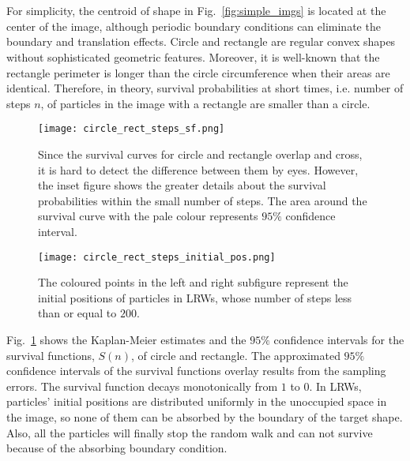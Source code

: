 


\section{}


For simplicity, the centroid of shape in Fig.~\ref{fig:simple_imgs} is
located at the center of the image, although periodic boundary
conditions can eliminate the boundary and translation effects. Circle
and rectangle are regular convex shapes without sophisticated
geometric features. Moreover, it is well-known that the rectangle
perimeter is longer than the circle circumference when their areas are
identical. Therefore, in theory, survival probabilities at short
times, i.e. number of steps $n$, of particles in the image with a
rectangle are smaller than a circle.


    \begin{figure}
      \centering
      \texttt{[image: circle\_rect\_steps\_sf.png]}
      \caption{Since the survival curves for circle and rectangle overlap and cross, it is hard to detect the difference between them by eyes. However, the inset figure shows the greater details about the survival probabilities within the small number of steps. The area around the survival curve with the pale colour represents $95\%$ confidence interval.}
      \label{fig:sf_simple_shape_steps}
    \end{figure}


   \begin{figure}
      \centering
      \texttt{[image: circle\_rect\_steps\_initial\_pos.png]}
      \caption{The coloured points in the left and right subfigure represent the initial positions of particles in LRWs, whose number of steps less than or equal to $200$.}
      \label{fig:cir_rect_steps_initial_pos}
    \end{figure}


Fig.~\ref{fig:sf_simple_shape_steps} shows the Kaplan-Meier estimates
and the $95\%$ confidence intervals for the survival functions,
$S(n)$, of circle and rectangle. The approximated $95\%$ confidence
intervals of the survival functions overlay results from the sampling
errors. The survival function decays monotonically from $1$ to $0$. In
LRWs, particles' initial positions are distributed uniformly in the
unoccupied space in the image, so none of them can be absorbed by the
boundary of the target shape. Also, all the particles will finally
stop the random walk and can not survive because of the absorbing
boundary condition.


